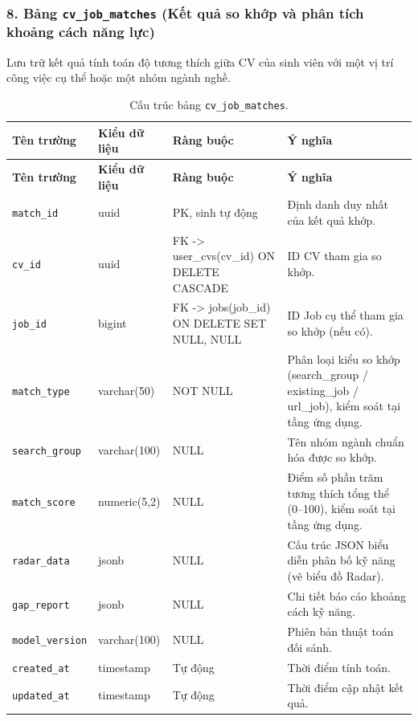 \subsubsection*{8. Bảng \texttt{cv\_\allowbreak job\_\allowbreak matches} (Kết quả so khớp và phân tích khoảng cách năng lực)}

Lưu trữ kết quả tính toán độ tương thích giữa CV của sinh viên với một vị trí công việc cụ thể hoặc một nhóm ngành nghề.

\begin{footnotesize}\begin{longtable}{|L{3.5cm}|L{2.0cm}|L{3.0cm}|L{5.5cm}|}
\caption{Cấu trúc bảng \texttt{cv\_\allowbreak job\_\allowbreak matches}.}
\label{tab:cv_job_matches} \\
\hline
\textbf{Tên trường} & \textbf{Kiểu dữ liệu} & \textbf{Ràng buộc} & \textbf{Ý nghĩa} \\
\hline
\endfirsthead
\hline
\textbf{Tên trường} & \textbf{Kiểu dữ liệu} & \textbf{Ràng buộc} & \textbf{Ý nghĩa} \\
\hline
\endhead
\texttt{match\_id} & uuid & PK, sinh tự động & Định danh duy nhất của kết quả khớp. \\
\hline
\texttt{cv\_id} & uuid & FK -> user\_cvs(cv\_id) ON DELETE CASCADE & ID CV tham gia so khớp. \\
\hline
\texttt{job\_id} & bigint & FK -> jobs(job\_id) ON DELETE SET NULL, NULL & ID Job cụ thể tham gia so khớp (nếu có). \\
\hline
\texttt{match\_type} & varchar(50) & NOT NULL & Phân loại kiểu so khớp (search\_group / existing\_job / url\_job), kiểm soát tại tầng ứng dụng. \\
\hline
\texttt{search\_\allowbreak group} & varchar(100) & NULL & Tên nhóm ngành chuẩn hóa được so khớp. \\
\hline
\texttt{match\_score} & numeric(5,2) & NULL & Điểm số phần trăm tương thích tổng thể (0--100), kiểm soát tại tầng ứng dụng. \\
\hline
\texttt{radar\_data} & jsonb & NULL & Cấu trúc JSON biểu diễn phân bố kỹ năng (vẽ biểu đồ Radar). \\
\hline
\texttt{gap\_report} & jsonb & NULL & Chi tiết báo cáo khoảng cách kỹ năng. \\
\hline
\texttt{model\_\allowbreak version} & varchar(100) & NULL & Phiên bản thuật toán đối sánh. \\
\hline
\texttt{created\_at} & timestamp & Tự động & Thời điểm tính toán. \\
\hline
\texttt{updated\_at} & timestamp & Tự động & Thời điểm cập nhật kết quả. \\
\hline
\end{longtable}
\end{footnotesize}

